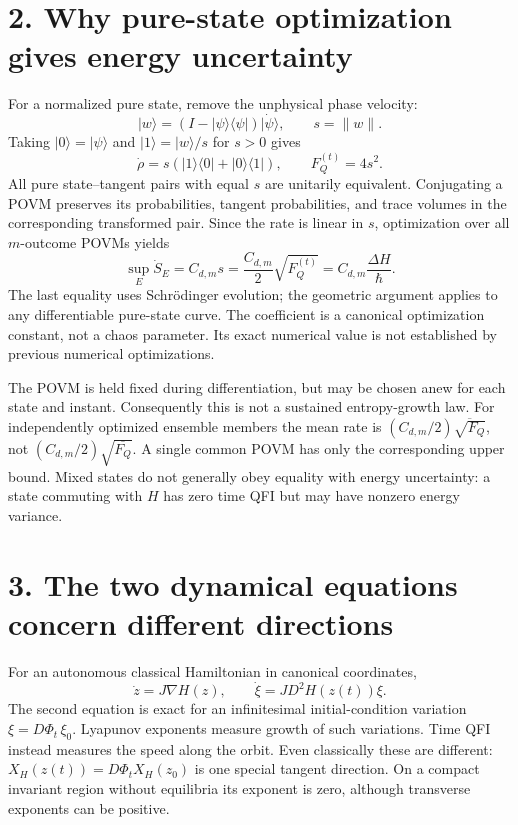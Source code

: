 \documentclass[11pt,a4paper]{article}
\begin{document}
\section*{2. Why pure-state optimization gives energy uncertainty}
For a normalized pure state, remove the unphysical phase velocity:
\[|w\rangle=(I-|\psi\rangle\langle\psi|)|\dot\psi\rangle,\qquad s=\|w\|.\]
Taking $|0\rangle=|\psi\rangle$ and $|1\rangle=|w\rangle/s$ for $s>0$ gives
\[\dot\rho=s(|1\rangle\langle0|+|0\rangle\langle1|),\qquad F_Q^{(t)}=4s^2.\]
All pure state--tangent pairs with equal $s$ are unitarily equivalent. Conjugating a POVM preserves its probabilities, tangent probabilities, and trace volumes in the corresponding transformed pair. Since the rate is linear in $s$, optimization over all $m$-outcome POVMs yields
\[\boxed{\sup_E\dot S_E=C_{d,m}s=\frac{C_{d,m}}2\sqrt{F_Q^{(t)}}=C_{d,m}\frac{\Delta H}{\hbar}.}\]
The last equality uses Schr\"odinger evolution; the geometric argument applies to any differentiable pure-state curve. The coefficient is a canonical optimization constant, not a chaos parameter. Its exact numerical value is not established by previous numerical optimizations.

The POVM is held fixed during differentiation, but may be chosen anew for each state and instant. Consequently this is not a sustained entropy-growth law. For independently optimized ensemble members the mean rate is $(C_{d,m}/2)\overline{\sqrt{F_Q}}$, not $(C_{d,m}/2)\sqrt{\overline{F_Q}}$. A single common POVM has only the corresponding upper bound. Mixed states do not generally obey equality with energy uncertainty: a state commuting with $H$ has zero time QFI but may have nonzero energy variance.

\section*{3. The two dynamical equations concern different directions}
For an autonomous classical Hamiltonian in canonical coordinates,
\[\dot z=J\nabla H(z),\qquad\dot\xi=JD^2H(z(t))\xi.\]
The second equation is exact for an infinitesimal initial-condition variation $\xi=D\Phi_t\,\xi_0$. Lyapunov exponents measure growth of such variations. Time QFI instead measures the speed along the orbit. Even classically these are different: $X_H(z(t))=D\Phi_tX_H(z_0)$ is one special tangent direction. On a compact invariant region without equilibria its exponent is zero, although transverse exponents can be positive.
\end{document}
